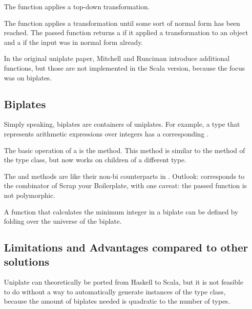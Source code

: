 The  function applies a top-down transformation.

The  function applies a transformation until some sort of
normal form has been reached. The passed function returns a  if
it applied a transformation to an object and a  if the input was
in normal form already.

In the original uniplate paper\cite{DBLP:conf/haskell/MitchellR07}, Mitchell
and Runciman introduce additional functions, but those are not implemented
in the Scala version, because the focus was on biplates.

\subsection{Biplates}
Simply speaking, biplates are containers of uniplates. For example, a type
 that represents arithmetic expressions over integers has a corresponding
.



The basic operation of a  is the  method. This method
is similar to the  method of the  type class, but now
works on children of a different type.

The  and  methods are like their non-bi counterparts
in . Outlook:  corresponds to the
 combinator of Scrap your Boilerplate\cite{DBLP:conf/tldi/LammelJ03},
with one caveat: the passed function is not polymorphic.

\begin{example}
A function that calculates the minimum integer in a biplate can be defined
by folding  over the universe of the biplate.


\end{example}

\subsection{Limitations and Advantages compared to other solutions}
Uniplate can theoretically be ported from Haskell to Scala, but it is not
feasible to do without a way to automatically generate instances of the
 type class, because the amount of biplates needed is quadratic
to the number of types.

